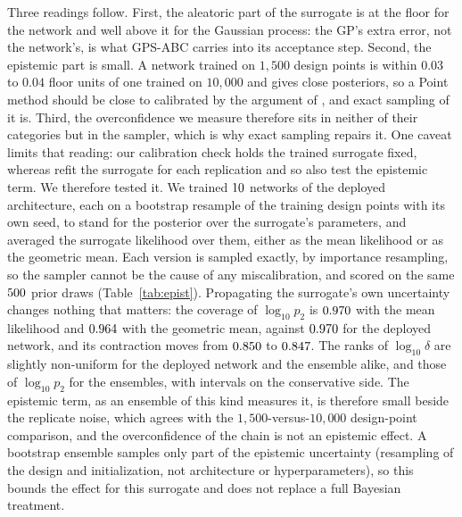 \documentclass[sn-basic,iicol,pdflatex]{sn-jnl}
\begin{document}
Three readings follow. First, the aleatoric part of the surrogate is at the floor for the network and well above it for the Gaussian process: the GP's extra error, not the network's, is what GPS-ABC carries into its acceptance step.
Second, the epistemic part is small. A network trained on $1{,}500$ design points is within $0.03$ to $0.04$ floor units of one trained on $10{,}000$ and gives close posteriors, so a Point method should be close to calibrated by the argument of \citet{reiser2025}, and exact sampling of it is.
Third, the overconfidence we measure therefore sits in neither of their categories but in the sampler, which is why exact sampling repairs it. One caveat limits that reading: our calibration check holds the trained surrogate fixed, whereas \citet{reiser2025} refit the surrogate for each
replication and so also test the epistemic term. We therefore tested it. We trained $10$ networks of the deployed architecture, each on a bootstrap resample of the training design points with its own seed, to stand for the posterior over the surrogate's parameters, and averaged the surrogate likelihood over them, either as the mean likelihood or as the geometric mean. Each version is sampled exactly, by importance resampling, so the sampler cannot be the cause of any miscalibration, and scored on the same $500$ prior draws (Table~\ref{tab:epist}). Propagating the surrogate's own uncertainty changes nothing that matters: the coverage of $\log_{10}p_2$ is $0.970$ with the mean likelihood and $0.964$ with the geometric mean, against $0.970$ for the deployed network, and its contraction moves from $0.850$ to $0.847$. The ranks of $\log_{10}\delta$ are slightly non-uniform for the deployed network and the ensemble alike, and those of $\log_{10}p_2$ for the ensembles, with intervals on the conservative side. The epistemic term, as an ensemble of this kind measures it, is therefore small beside the replicate noise, which agrees with the $1{,}500$-versus-$10{,}000$ design-point comparison, and the overconfidence of the chain is not an epistemic effect. A bootstrap ensemble samples only part of the epistemic uncertainty (resampling of the design and initialization, not architecture or hyperparameters), so this bounds the effect for this surrogate and does not replace a full Bayesian treatment.
\end{document}
